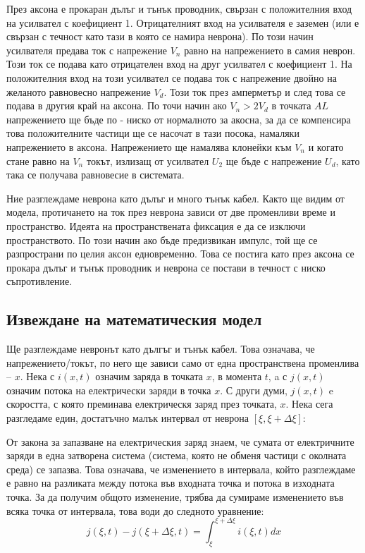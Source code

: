 \documentclass{article}
\begin{document}
        През аксона е прокаран дълъг и тънък проводник, свързан с положителния вход на усилвател с коефициент 1. Отрицателният вход на усилвателя
        е заземен (или е свързан с течност като тази в която се намира неврона). По този начин усилвателя предава ток с напрежение $V_n$ равно на
        напрежението в самия неврон. Този ток се подава като отрицателен вход на друг усилвател с коефициент 1. На положителния вход на този
        усилвател се подава ток с напрежение двойно на желаното равновесно напрежение $V_d$. Този ток през амперметър и след това се подава в
        другия край на аксона. По точи начин ако $V_n > 2V_d$ в точката $AL$ напрежението ще бъде по - ниско от нормалното за акосна, за да се
        компенсира това положителните частици ще се насочат в тази посока, намаляки напрежението в аксона. Напрежението ще намалява клонейки към
        $V_n$ и когато стане равно на $V_n$ токът, излизащ от усилвател $U_2$ ще бъде с напрежение $U_d$, като така се получава равновесие в
        системата.

        Ние разглеждаме неврона като дълъг и много тънък кабел. Както ще видим от модела, протичането на ток през неврона
        зависи от две променливи време и пространство. Идеята на пространствената фиксация е да се изключи пространството.
        По този начин ако бъде предизвикан импулс, той ще се разпространи по целия аксон едновременно. Това се постига като
        през аксона се прокара дълъг и тънък проводник и неврона се постави в течност с ниско съпротивление.
    \subsection{Извеждане на математическия модел}
    Ще разглеждаме невронът като дългъг и тънък кабел. Това означава, че напрежението/токът, по него ще зависи само от една пространствена
    променлива -- $x$. Нека с $i\left(x, t\right)$ означим заряда в точката $x$, в момента $t$, a с $j\left(x, t\right)$ означим потока на електрически заряди в точка $x$. С други думи, $j\left(x, t\right)$ e
    скоростта, с която преминава електрическя заряд през точката, $x$. Нека сега разгледаме един, достатъчно малък интервал от неврона
    $\left[\xi, \xi+\Delta\xi\right]$:

    \begin{figure}[h!]
        \centering
        
        \caption{}
    \end{figure}

    От закона за запазване на електрическия заряд знаем, че сумата от електричните заряди в една затворена система (система, която не обменя
    частици с околната среда) се запазва. Това означава, че изменението в интервала, който разглеждаме е равно на разликата между потока във
    входната точка и потока в изходната точка. За да получим общото изменение, трябва да сумираме изменението във всяка точка от интервала,
    това води до следното уравнение:
    \begin{equation}\label{integral_form}
        j\left(\xi,t\right) - j\left(\xi + \Delta\xi, t\right) = \int_{\xi}^{\xi + \Delta\xi} i\left(\xi,t\right)dx
    \end{equation}
\end{document}
